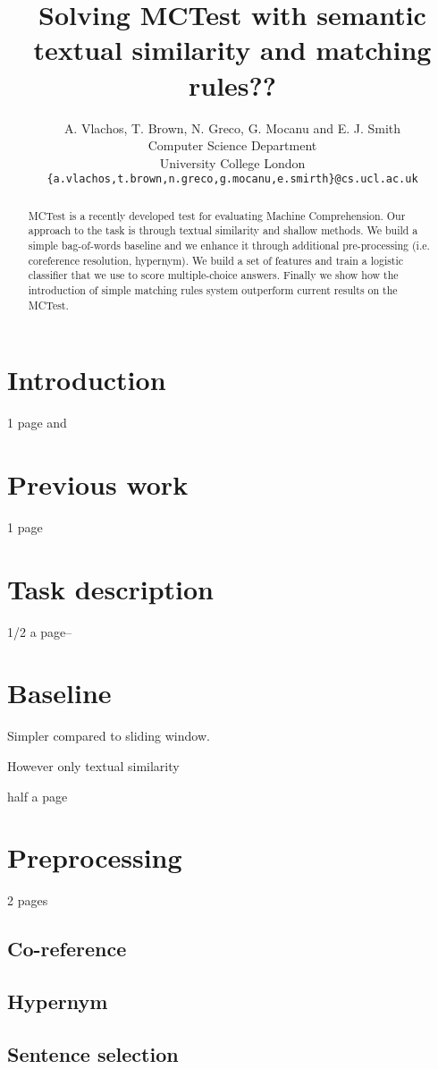 \documentclass[11pt]{article}
\title{Solving MCTest with semantic textual similarity and matching rules??}
\author
       {A. Vlachos, T. Brown, N. Greco, G. Mocanu and E. J. Smith
       \\
       Computer Science Department\\
	University College London\\
       \tt{\{a.vlachos,t.brown,n.greco,g.mocanu,e.smirth\}@cs.ucl.ac.uk}\\ 
       }
\date{}
\begin{document}
\maketitle
\begin{abstract}
MCTest is a recently developed test for evaluating Machine Comprehension. Our approach to the task is through textual similarity and shallow methods. We build a simple bag-of-words baseline and we enhance it through additional pre-processing (i.e. coreference resolution, hypernym). We build a set of features and train a logistic classifier that we use to score multiple-choice answers. Finally we show how the introduction of simple matching rules system outperform current results on the MCTest.
\end{abstract}

\section{Introduction}
1 page \cite{mctest} and 

\section{Previous work}
1 page

\section{Task description}
1/2 a page--

\section{Baseline}
Simpler compared to sliding window.

However only textual similarity

half a page
\section{Preprocessing}
2 pages
\subsection{Co-reference}
\subsection{Hypernym}
\subsection{Sentence selection}
\end{document}
